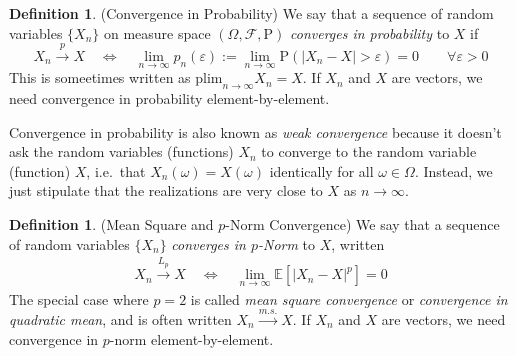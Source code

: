 \documentclass[12pt]{article}
\theoremstyle{plain}
\theoremstyle{definition}
\newtheorem{defn}[thm]{Definition}
\theoremstyle{remark}
\newcommand{\limn}{\lim_{n\rightarrow\infty}}
\newcommand{\Prb}{\mathrm{P}}
\newcommand{\calF}{\mathcal{F}}
\newcommand{\E}{\mathbb{E}}
\newcommand{\pto}{\xrightarrow{p}}
\newcommand{\msto}{\xrightarrow{m.s.}}
\newcommand{\Lpto}{\xrightarrow{L_p}}
\newcommand{\plim}{\text{plim}_{n\rightarrow\infty}}
\begin{document}
\begin{defn}{(Convergence in Probability)}
We say that a sequence of random variables $\{ X_n \}$ on measure space
$(\Omega,\calF,\Prb)$ \emph{converges in probability} to $X$ if
\begin{equation}
  \label{plim}
  X_n\pto X
  \quad\iff\quad
  \limn p_n(\varepsilon) :=
  \limn
  \Prb(\left\lvert X_n - X \right\rvert > \varepsilon) = 0
  \qquad \forall  \varepsilon> 0
\end{equation}
This is someetimes written as $\plim X_n = X$.
 If $X_n$ and $X$ are vectors, we need convergence in probability
 element-by-element.


Convergence in probability is also known as \emph{weak convergence}
because it doesn't ask the random variables (functions) $X_n$ to
converge to the random variable (function) $X$, i.e.\ that
$X_n(\omega)=X(\omega)$ identically for all $\omega\in\Omega$.  Instead,
we just stipulate that the realizations are very close to $X$ as
$n\rightarrow\infty$.
\end{defn}

\begin{defn}{(Mean Square and $p$-Norm Convergence)}
We say that a sequence of random variables $\{ X_n \}$
\emph{converges in $p$-Norm} to $X$, written
\begin{align*}
  X_n \Lpto X
  \quad\iff\quad
  \limn \E\left[|X_n-X|^p\right] = 0
\end{align*}
The special case where $p=2$ is called \emph{mean square convergence} or
\emph{convergence in quadratic mean}, and is often written $X_n\msto X$.
If $X_n$ and $X$ are vectors, we need convergence in $p$-norm
element-by-element.
\end{defn}
\end{document}
